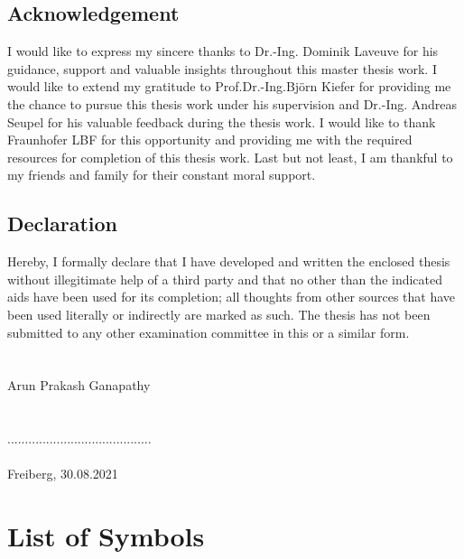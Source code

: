 \documentclass[12pt,a4paper,twoside,openright]{report}
\begin{document}
\section*{\LARGE{Acknowledgement} }
\vspace*{1cm}
\indent\indent\indent   I would like to express my sincere thanks to Dr.-Ing. Dominik Laveuve for his guidance, support and valuable insights throughout this master thesis work.  I would like to extend my gratitude to Prof.Dr.-Ing.Björn Kiefer for providing me the chance to pursue this thesis work under his supervision and Dr.-Ing. Andreas Seupel for his valuable feedback during the thesis work.  I would like to thank Fraunhofer LBF for this opportunity and providing me with the required resources for completion of this thesis work. Last but not least, I am thankful to my friends and family for their constant moral support.



\clearpage
\thispagestyle{empty}
\hfill
\clearpage
\vspace*{2cm}
\section*{\LARGE{Declaration} }
\vspace*{1cm}
\indent\indent\indent Hereby, I  formally declare that I  have developed and written the enclosed thesis 
without illegitimate help of a third party and that no other than the indicated aids have been used for its completion; all thoughts from other sources that have been used literally or indirectly are marked as such. The thesis has not been submitted to any other examination committee in this or a similar form.\\\\\\ Arun Prakash Ganapathy  \\\\\\ .........................................  \\\\ Freiberg, 30.08.2021





\tableofcontents
\listoffigures
\listoftables


\chapter*{List of Symbols}
\end{document}
